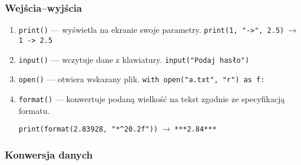 \subsubsection*{Wejścia--wyjścia}

\begin{enumerate}[]
    \item \verb|print()| --- wyświetla na ekranie swoje parametry. \verb|print(1, "->", 2.5)|$\ \to\ $\verb|1 -> 2.5|
    \item \verb|input()| --- wczytuje dane z klawiatury. \verb|input("Podaj hasło")|
    \item \verb|open()| --- otwiera wskazany plik. \verb|with open("a.txt", "r") as f:|
    \item \verb|format()| --- konwertuje podaną wielkość na tekst zgodnie ze specyfikacją formatu.

    \verb|print(format(2.83928, "*^20.2f"))|$\ \to\ $\verb|***2.84***|
    \label{funkcja-format}
\end{enumerate}

\subsubsection*{Konwersja danych}

